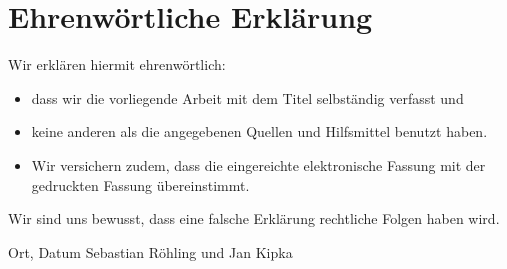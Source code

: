\clearpage
\chapter*{Ehrenwörtliche Erklärung}	



Wir erklären hiermit ehrenwörtlich: 

\begin{itemize}
	\item dass wir die vorliegende Arbeit mit dem Titel \textit{\DerTitelDerArbeit} selbständig verfasst und
	\item keine anderen als die angegebenen Quellen und Hilfsmittel benutzt haben. 
	\item Wir versichern zudem, dass die eingereichte elektronische Fassung mit der gedruckten Fassung übereinstimmt.
\end{itemize}
Wir sind uns bewusst, dass eine falsche Erklärung rechtliche Folgen haben wird.

\vspace{3cm}
Ort, Datum \hfill Sebastian Röhling und Jan Kipka 